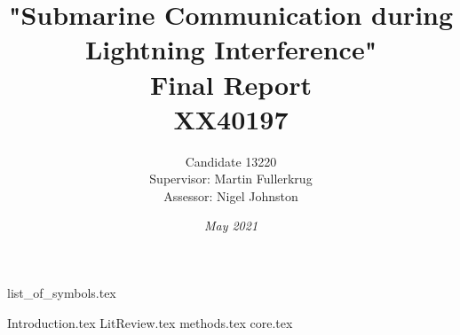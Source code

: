 \documentclass[11pt, oneside, a4paper]{report}
\begin{document}
\begin{titlepage}
    \title{"Submarine Communication during Lightning Interference"\\ Final Report \\ XX40197}
    \author{Candidate 13220 \\[0.5cm] Supervisor: Martin Fullerkrug \\[0.5cm] Assessor: Nigel Johnston}
    \date{\textit{May 2021}}
\end{titlepage}


\maketitle

\setcounter{page}{0}
\tableofcontents
\thispagestyle{empty}
\newpage
{}
\renewcommand{\thesection}{\Roman{section}}
\listoffigures
\pagebreak
{}
\listoftables
\pagebreak
{list_of_symbols.tex}
\newpage
\setcounter{section}{0}

\setcounter{page}{1}
\renewcommand{\thesection}{\arabic{chapter}.\arabic{section}}
{Introduction.tex}
\pagebreak
{LitReview.tex}
\pagebreak
{methods.tex}
\pagebreak
{core.tex}
\renewcommand{\bibname}{References}


\end{document}
